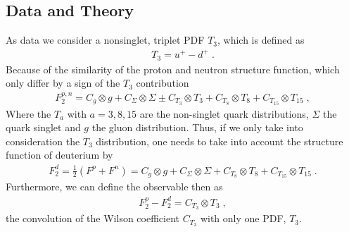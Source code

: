 \documentclass[11pt,a4paper]{article}
\begin{document}
\subsection{Data and Theory}
%
As data we consider a nonsinglet, triplet PDF $T_3$, which is defined as 
%
\begin{align}
    T_3 = u^+ - d^+ \; .
\end{align}
%
Because of the similarity of the proton and neutron structure function, which only differ by a sign of the $T_3$ contribution
%
\begin{align}
    F_2^{p,n} = C_g \otimes g + C_\Sigma \otimes \Sigma \pm C_{T_3} \otimes T_3 + C_{T_8} \otimes T_8 + C_{T_{15}} \otimes T_{15} \; ,
\end{align}
%
Where the $T_a$ with $a=3,8,15$ are the non-singlet quark distributions, $\Sigma$ the quark singlet and $g$ the gluon distribution.
Thus, if we only take into consideration the $T_3$ distribution, one needs to take into account the structure function of deuterium by 
%
\begin{align}
    F_2^d = \frac{1}{2} (F^p + F^n) = C_g \otimes g + C_\Sigma \otimes \Sigma + C_{T_8} \otimes T_8 + C_{T_{15}} \otimes T_{15} \; .
\end{align}
%
Furthermore, we can define the observable then as
%
\begin{align}
    F_2^p - F_2^d = C_{T_3} \otimes T_3 \; ,
\end{align}
%
the convolution of the Wilson coefficient $C_{T_3}$ with only one PDF, $T_3$.
\end{document}
